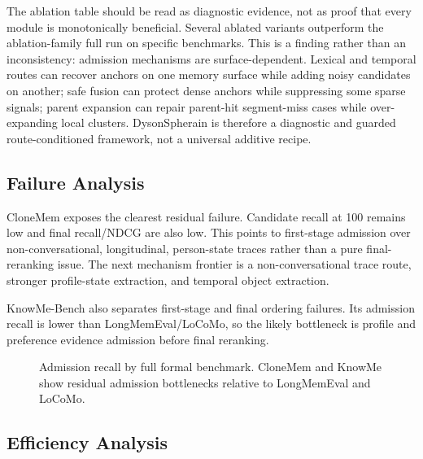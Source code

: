 \documentclass[10pt]{article}
\newcommand{\system}{DysonSpherain}
\newcommand{\artifact}[1]{\texttt{\small #1}}
\begin{document}
\begin{table}[t]
  \centering
\caption{Diagnostic ablation deltas generated from
  \artifact{paper/figures/data/ablation\_waterfall\_data.csv}. Deltas are
  relative to the ablation-family full row, not the formal full run. Positive
  values mean the ablated variant is higher on that metric.}
  \label{tab:ablations}
  
\end{table}

The ablation table should be read as diagnostic evidence, not as proof that
every module is monotonically beneficial. Several ablated variants outperform
the ablation-family full run on specific benchmarks. This is a finding rather
than an inconsistency: admission mechanisms are surface-dependent. Lexical and
temporal routes can recover anchors on one memory surface while adding noisy
candidates on another; safe fusion can protect dense anchors while suppressing
some sparse signals; parent expansion can repair parent-hit segment-miss cases
while over-expanding local clusters. \system{} is therefore a diagnostic and
guarded route-conditioned framework, not a universal additive recipe.

\subsection{Failure Analysis}

CloneMem exposes the clearest residual failure. Candidate recall at 100 remains
low and final recall/NDCG are also low. This points to first-stage admission
over non-conversational, longitudinal, person-state traces rather than a pure
final-reranking issue. The next mechanism frontier is a non-conversational
trace route, stronger profile-state extraction, and temporal object extraction.

KnowMe-Bench also separates first-stage and final ordering failures. Its
admission recall is lower than LongMemEval/LoCoMo, so the likely bottleneck is
profile and preference evidence admission before final reranking.

\begin{figure}[t]
  \centering
  
  \caption{Admission recall by full formal benchmark. CloneMem and KnowMe show
  residual admission bottlenecks relative to LongMemEval and LoCoMo.}
  \label{fig:failure-breakdown}
\end{figure}

\subsection{Efficiency Analysis}
\end{document}
